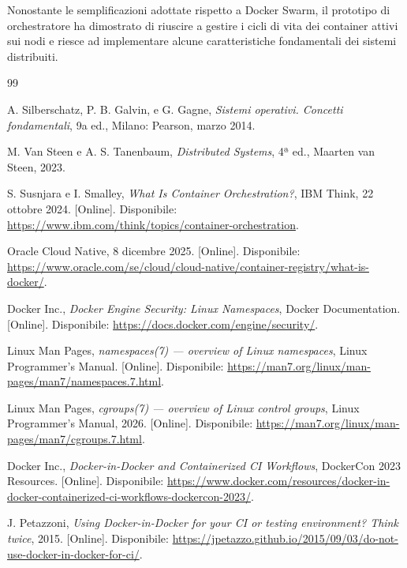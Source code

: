 \documentclass[12pt,a4paper]{article}
\begin{document}
Nonostante le semplificazioni adottate rispetto a Docker Swarm, il prototipo di orchestratore ha dimostrato di riuscire a gestire i cicli di vita dei container attivi sui nodi e riesce ad implementare alcune caratteristiche fondamentali dei sistemi distribuiti.

\newpage
{}

\begin{thebibliography}{99}

A. Silberschatz, P. B. Galvin, e G. Gagne, \textit{Sistemi operativi. Concetti fondamentali}, 9a ed., Milano: Pearson, marzo 2014.

M. Van Steen e A. S. Tanenbaum,
\textit{Distributed Systems}, 4ª ed.,
Maarten van Steen, 2023.


S. Susnjara e I. Smalley,
\textit{What Is Container Orchestration?},
IBM Think, 22 ottobre 2024.
[Online]. Disponibile: \url{https://www.ibm.com/think/topics/container-orchestration}.

Oracle Cloud Native, 8 dicembre 2025.
[Online]. Disponibile: \url{https://www.oracle.com/se/cloud/cloud-native/container-registry/what-is-docker/}.

Docker Inc.,
\textit{Docker Engine Security: Linux Namespaces}, Docker Documentation.
[Online]. Disponibile: \url{https://docs.docker.com/engine/security/}.

Linux Man Pages,
\textit{namespaces(7) — overview of Linux namespaces}, Linux Programmer's Manual.
[Online]. Disponibile: \url{https://man7.org/linux/man-pages/man7/namespaces.7.html}.

Linux Man Pages,
\textit{cgroups(7) — overview of Linux control groups}, Linux Programmer's Manual, 2026.
[Online]. Disponibile: \url{https://man7.org/linux/man-pages/man7/cgroups.7.html}.

Docker Inc.,
\textit{Docker-in-Docker and Containerized CI Workflows}, DockerCon 2023 Resources.
[Online]. Disponibile: \url{https://www.docker.com/resources/docker-in-docker-containerized-ci-workflows-dockercon-2023/}.

J. Petazzoni,
\textit{Using Docker-in-Docker for your CI or testing environment? Think twice}, 2015.
[Online]. Disponibile: \url{https://jpetazzo.github.io/2015/09/03/do-not-use-docker-in-docker-for-ci/}.


\end{thebibliography}
\end{document}
